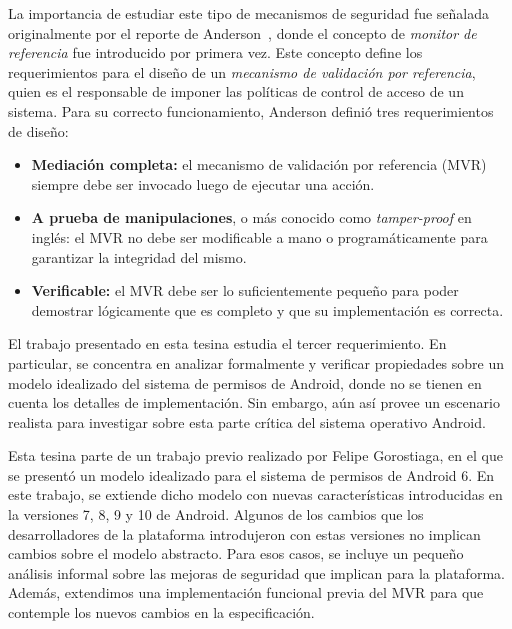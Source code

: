 La importancia de estudiar este tipo de mecanismos de seguridad fue señalada originalmente por el
reporte de Anderson~\cite{Anderson:1972}, donde el concepto de \textit{monitor de referencia} fue
introducido por primera vez. Este concepto define los requerimientos para el diseño de un
\textit{mecanismo de validación por referencia}, quien es el responsable de imponer las políticas de
control de acceso de un sistema. Para su correcto funcionamiento, Anderson definió tres
requerimientos de diseño:

\begin{itemize}
    \item \textbf{Mediación completa:} el mecanismo de validación por referencia (MVR) siempre debe
          ser invocado luego de ejecutar una acción.
    \item \textbf{A prueba de manipulaciones}, o más conocido como \textit{tamper-proof} en inglés:
          el MVR no debe ser modificable a mano o programáticamente para garantizar la
          integridad del mismo.
    \item \textbf{Verificable:} el MVR debe ser lo suficientemente pequeño para poder demostrar
          lógicamente que es completo y que su implementación es correcta.
\end{itemize}

El trabajo presentado en esta tesina estudia el tercer requerimiento. En particular, se concentra en
analizar formalmente y verificar propiedades sobre un modelo idealizado del sistema de permisos de
Android, donde no se tienen en cuenta los detalles de implementación. Sin embargo, aún así provee un
escenario realista para investigar sobre esta parte crítica del sistema operativo Android.

Esta tesina parte de un trabajo previo realizado por Felipe Gorostiaga\cite{fgorostiaga}, en el que
se presentó un modelo idealizado para el sistema de permisos de Android 6. En este trabajo, se
extiende dicho modelo con nuevas características introducidas en la versiones 7, 8, 9 y 10 de
Android. Algunos de los cambios que los desarrolladores de la plataforma introdujeron con estas
versiones no implican cambios sobre el modelo abstracto. Para esos casos, se incluye un pequeño
análisis informal sobre las mejoras de seguridad que implican para la plataforma. Además, extendimos
una implementación funcional previa del MVR para que contemple los nuevos cambios en la
especificación.

